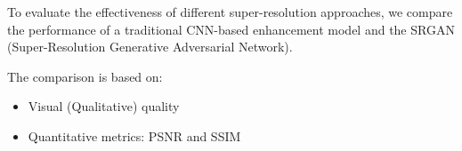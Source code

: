 To evaluate the effectiveness of different super-resolution approaches, we compare the performance of a traditional CNN-based enhancement model and the SRGAN (Super-Resolution Generative Adversarial Network).

The comparison is based on:

\begin{itemize}
    \item Visual (Qualitative) quality
    
    \item Quantitative metrics: PSNR and SSIM
\end{itemize}

\begin{table}[h!]
    \centering
    \caption{Comparison of CNN and SRGAN Models on Image Quality Metrics}
\end{table}






